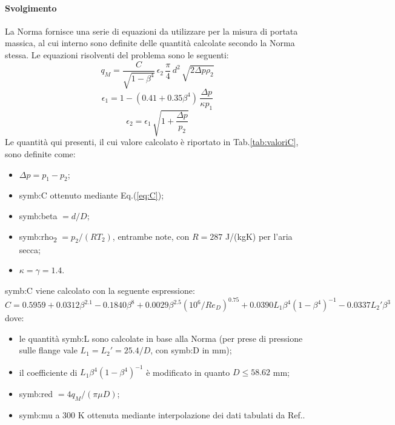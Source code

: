 \paragraph{Svolgimento}
La Norma fornisce una serie di equazioni da utilizzare per la misura di portata massica, al cui interno sono definite delle quantità calcolate secondo la Norma stessa. Le equazioni risolventi del problema sono le seguenti:
\begin{equation}
	q_M=\frac{C}{\sqrt{1-\beta^4}}\, \epsilon_2 \,\frac{\pi}{4} \, d^2 \, \sqrt{2\Delta p \rho_2} \label{eq:portatamassica}
\end{equation}
\begin{equation}
	\epsilon_1= 1 - (0.41+0.35\beta^4) \, \frac{\Delta p}{\kappa p_1} \label{eq:epsilon1}
\end{equation}
\begin{equation}
	\epsilon_2=\epsilon_1 \, \sqrt{1+\frac{\Delta p}{p_2}} \label{eq:epsilon2}
\end{equation}
Le quantità qui presenti, il cui valore calcolato è riportato in Tab.\ref{tab:valoriC}, sono definite come:
\begin{itemize}
	\item $\Delta p = p_1-p_2$;
	\item \gls{symb:C} ottenuto mediante Eq.(\ref{eq:C});
	\item \gls{symb:beta} $ = d/D$;
	\item \gls{symb:rho}\textsubscript{2} $= p_2 / (RT_2) $, entrambe note, con $ R = 287 $ J/(kgK) per l'aria secca;
	\item $\kappa = \gamma = 1.4 $.
\end{itemize}
\gls{symb:C} viene calcolato con la seguente espressione:
\begin{equation}
	C=0.5959+0.0312\beta^{2.1}-0.1840\beta^8+0.0029\beta^{2.5}	
	 (10^6/Re_D)^{0.75}+0.0390L_1\beta^4(1-\beta^4)^{-1}-0.0337L_2'\beta^3 \label{eq:C}
\end{equation}
dove:
\begin{itemize}
	\item le quantità \gls{symb:L} sono calcolate in base alla Norma (per prese di pressione sulle flange vale $L_1=L_2'=25.4/D$, con \gls{symb:D} in mm);
	\item il coefficiente di $L_1\beta^4(1-\beta^4)^{-1}$ è modificato in quanto $D\leqslant58.62$ mm;
	\item \gls{symb:red} $=4q_M/(\pi \mu D)$;
	\item \gls{symb:mu} a 300 K ottenuta mediante interpolazione dei dati tabulati da Ref.\cite{Cengel}. 
\end{itemize} 
